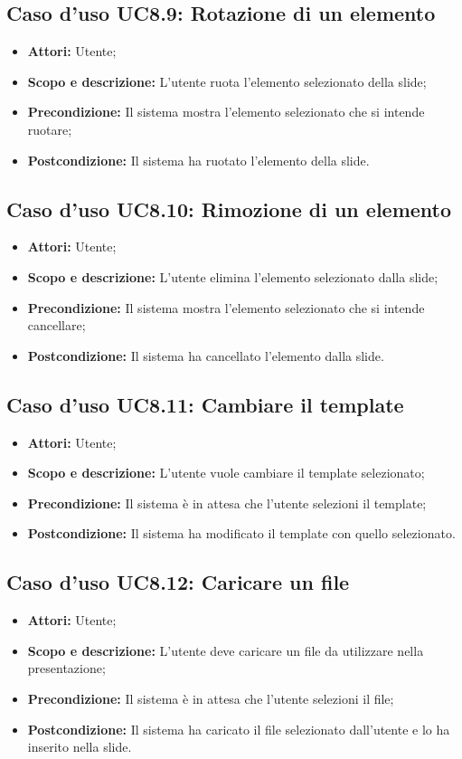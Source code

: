 \subsection{Caso d'uso UC8.9: Rotazione di un elemento}
\begin{itemize}
	\item \textbf{Attori:} Utente;
	\item \textbf{Scopo e descrizione:} L'utente ruota l'elemento selezionato della slide;
	\item \textbf{Precondizione:} Il sistema mostra l'elemento selezionato che si intende ruotare;
	\item \textbf{Postcondizione:} Il sistema ha ruotato l'elemento della slide.
\end{itemize}

\subsection{Caso d'uso UC8.10: Rimozione di un elemento}
\begin{itemize}
	\item \textbf{Attori:} Utente;
	\item \textbf{Scopo e descrizione:} L'utente elimina l'elemento selezionato dalla slide;
	\item \textbf{Precondizione:} Il sistema mostra l'elemento selezionato che si intende cancellare;
	\item \textbf{Postcondizione:} Il sistema ha cancellato l'elemento dalla slide.
\end{itemize}

\subsection{Caso d'uso UC8.11: Cambiare il template}
\begin{itemize}
	\item \textbf{Attori:} Utente;
	\item \textbf{Scopo e descrizione:} L'utente vuole cambiare il template selezionato;
	\item \textbf{Precondizione:} Il sistema è in attesa che l'utente selezioni il template;
	\item \textbf{Postcondizione:} Il sistema ha modificato il template con quello selezionato.
\end{itemize}

\subsection{Caso d'uso UC8.12: Caricare un file}
\begin{itemize}
	\item \textbf{Attori:} Utente;
	\item \textbf{Scopo e descrizione:} L'utente deve caricare un file da utilizzare nella presentazione;
	\item \textbf{Precondizione:} Il sistema è in attesa che l'utente selezioni il file;
	\item \textbf{Postcondizione:} Il sistema ha caricato il file selezionato dall'utente e lo ha inserito nella slide.
\end{itemize}

